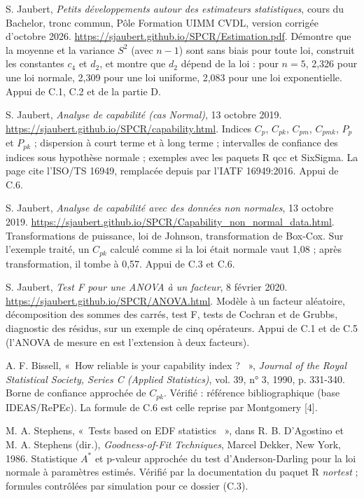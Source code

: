 \documentclass[11pt,a4paper]{article}
\providecommand{\og}{«~}\providecommand{\fg}{~»}
\begin{document}
\begin{enumerate}[label={[\arabic*]},leftmargin=2.2em,itemsep=2pt]
\item S. Jaubert, \emph{Petits développements autour des estimateurs statistiques}, cours du Bachelor, tronc commun, Pôle Formation UIMM CVDL, version corrigée d'octobre 2026. \url{https://sjaubert.github.io/SPCR/Estimation.pdf}. Démontre que la moyenne et la variance $S^2$ (avec $n-1$) sont sans biais pour toute loi, construit les constantes $c_4$ et $d_2$, et montre que $d_2$ dépend de la loi : pour $n=5$, 2,326 pour une loi normale, 2,309 pour une loi uniforme, 2,083 pour une loi exponentielle. Appui de C.1, C.2 et de la partie D.
\item S. Jaubert, \emph{Analyse de capabilité (cas Normal)}, 13 octobre 2019. \url{https://sjaubert.github.io/SPCR/capability.html}. Indices $C_p$, $C_{pk}$, $C_{pm}$, $C_{pmk}$, $P_p$ et $P_{pk}$ ; dispersion à court terme et à long terme ; intervalles de confiance des indices sous hypothèse normale ; exemples avec les paquets R qcc et SixSigma. La page cite l'ISO/TS 16949, remplacée depuis par l'IATF 16949:2016. Appui de C.6.
\item S. Jaubert, \emph{Analyse de capabilité avec des données non normales}, 13 octobre 2019. \url{https://sjaubert.github.io/SPCR/Capability_non_normal_data.html}. Transformations de puissance, loi de Johnson, transformation de Box-Cox. Sur l'exemple traité, un $C_{pk}$ calculé comme si la loi était normale vaut 1,08 ; après transformation, il tombe à 0,57. Appui de C.3 et C.6.
\item S. Jaubert, \emph{Test F pour une ANOVA à un facteur}, 8 février 2020. \url{https://sjaubert.github.io/SPCR/ANOVA.html}. Modèle à un facteur aléatoire, décomposition des sommes des carrés, test F, tests de Cochran et de Grubbs, diagnostic des résidus, sur un exemple de cinq opérateurs. Appui de C.1 et de C.5 (l'ANOVA de mesure en est l'extension à deux facteurs).
\item A. F. Bissell, \og How reliable is your capability index ? \fg, \emph{Journal of the Royal Statistical Society, Series C (Applied Statistics)}, vol. 39, n° 3, 1990, p. 331-340. Borne de confiance approchée de $C_{pk}$. Vérifié : référence bibliographique (base IDEAS/RePEc). La formule de C.6 est celle reprise par Montgomery [4].
\item M. A. Stephens, \og Tests based on EDF statistics \fg, dans R. B. D'Agostino et M. A. Stephens (dir.), \emph{Goodness-of-Fit Techniques}, Marcel Dekker, New York, 1986. Statistique $A^*$ et p-valeur approchée du test d'Anderson-Darling pour la loi normale à paramètres estimés. Vérifié par la documentation du paquet R \emph{nortest} ; formules contrôlées par simulation pour ce dossier (C.3).

\end{enumerate}
\end{document}
